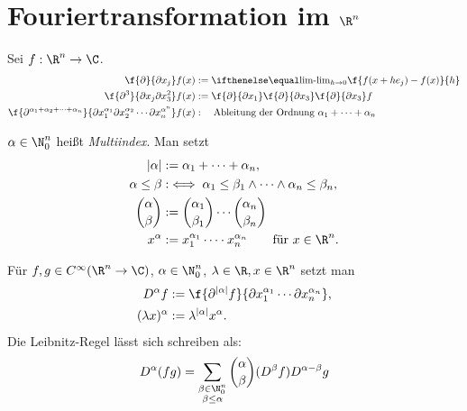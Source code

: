\section{Fouriertransformation im \texorpdfstring{$\R^n$}{R\textasciicircum n}}


\begin{nt*}[Erinnerung]
	Sei $f : \R^n \to \C$.
	\begin{align*}
		\f{\partial }{\partial x_j}f(x) &:= \lim_{h\to 0} \f {f(x+he_j)-f(x)}{h} \\
		\f{\partial^3 }{\partial x_j \partial x_3^2}f(x) &:= \f{\partial }{\partial x_1}\f{\partial }{\partial x_3}\f{\partial }{\partial x_3} f \\
		\f{\partial^{\alpha_1 + \alpha_2 + \dotsb + \alpha_n} }{\partial x_1^{\alpha_1} \partial x_2^{\alpha_2} \dotsb \partial x_n^{\alpha^n}}f(x)  &: \quad \text{Ableitung der Ordnung $\alpha_1 + \dotsb + \alpha_n$}
	\end{align*}
\end{nt*}

\begin{df} \label{4.27}
	$\alpha \in \N_0^n$ heißt \emph{Multiindex}.
	Man setzt
	\begin{align*}
		|\alpha| &:= \alpha_1 + \dotsb + \alpha_n, \\
		\alpha \le \beta &:\iff \alpha_1 \le \beta_1 \land \dotsb \land \alpha_n \le \beta_n, \\
		\binom{\alpha}{\beta} &:= \binom{\alpha_1}{\beta_1}  \dotsb \binom{\alpha_n}{\beta_n} \\
		x^\alpha &:= x_1^{\alpha_1}  \dotsb \cdot x_n^{\alpha_n} \qquad \text{für $x\in \R^n$.}
	\end{align*}
\end{df}

\begin{ex}[Anwendung] \label{4.28}
	Für $f, g \in C^\infty (\R^n \to \C)$, $\alpha \in \N_0^n$, $\lambda \in \R, x \in \R^n$ setzt man
	\begin{align*}
		D^\alpha f &:= \f {\partial^{|\alpha|}f}{\partial x_1^{\alpha_1} \dotsb \partial x_n^{\alpha_n}},\\
		(\lambda x)^\alpha &:= \lambda^{|\alpha|} x^\alpha.
	\end{align*}
	Die Leibnitz-Regel lässt sich schreiben als:
	\[
		D^\alpha(f g) = \sum_{\substack{\beta \in \N_0^n \\ \beta \le \alpha}} \binom{\alpha}{\beta} (D^\beta f)D^{\alpha - \beta} g
	\]
\end{ex}

